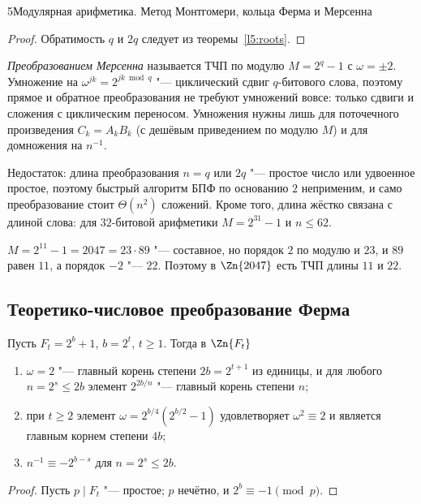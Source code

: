 \begin{lecture}{5}{Модулярная арифметика. Метод Монтгомери, кольца Ферма и Мерсенна}
\begin{proof}
Обратимость $q$ и $2q$ следует из теоремы~\ref{l5:roots}.
\end{proof}

\emph{Преобразованием Мерсенна} называется ТЧП по модулю $M = 2^q - 1$ с $\omega = \pm 2$.
Умножение на $\omega^{jk} = 2^{jk \bmod q}$ "--- циклический сдвиг $q$-битового слова, поэтому
прямое и обратное преобразования не требуют умножений вовсе: только сдвиги и сложения с
циклическим переносом. Умножения нужны лишь для поточечного произведения $C_k = A_k B_k$
(с дешёвым приведением по модулю $M$) и для домножения на $n^{-1}$.

Недостаток: длина преобразования $n = q$ или $2q$ "--- простое число или удвоенное простое,
поэтому быстрый алгоритм БПФ по основанию $2$ неприменим, и само преобразование стоит
$\Theta(n^2)$ сложений. Кроме того, длина жёстко связана с длиной слова: для $32$-битовой
арифметики $M = 2^{31} - 1$ и $n \le 62$.

\begin{example}
$M = 2^{11} - 1 = 2047 = 23 \cdot 89$ "--- составное, но порядок $2$ по модулю и $23$, и $89$
равен $11$, а порядок $-2$ "--- $22$. Поэтому в $\Zn{2047}$ есть ТЧП длины $11$ и $22$.
\end{example}


\subsection{Теоретико-числовое преобразование Ферма}

\begin{theorem}\label{l5:fnt}
Пусть $F_t = 2^b + 1$, $b = 2^t$, $t \ge 1$. Тогда в $\Zn{F_t}$
\begin{enumerate}
  \item $\omega = 2$ "--- главный корень степени $2b = 2^{t+1}$ из единицы, и для любого
    $n = 2^s \le 2b$ элемент $2^{2b/n}$ "--- главный корень степени $n$;
  \item при $t \ge 2$ элемент $\omega = 2^{b/4}(2^{b/2} - 1)$ удовлетворяет
    $\omega^2 \equiv 2$ и является главным корнем степени $4b$;
  \item $n^{-1} \equiv -2^{b - s}$ для $n = 2^s \le 2b$.
\end{enumerate}
\end{theorem}

\begin{proof}
Пусть $p \mid F_t$ "--- простое; $p$ нечётно, и $2^b \equiv -1 \pmod p$.


\end{proof}
\end{lecture}
